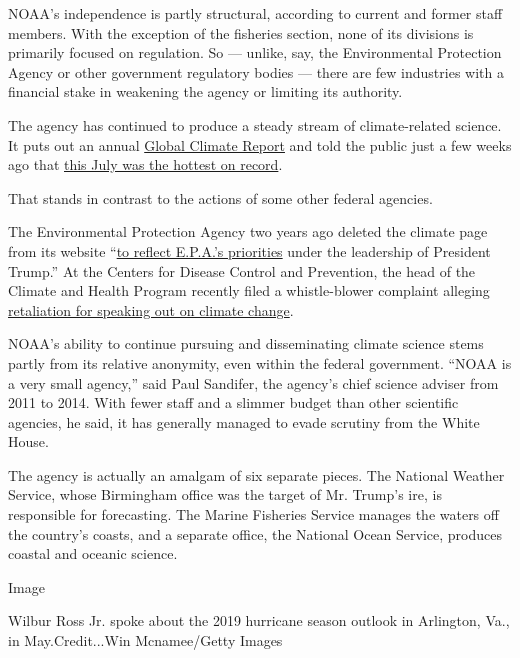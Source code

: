 NOAA's independence is partly structural, according to current and
former staff members. With the exception of the fisheries section, none
of its divisions is primarily focused on regulation. So --- unlike, say,
the Environmental Protection Agency or other government regulatory
bodies --- there are few industries with a financial stake in weakening
the agency or limiting its authority.

The agency has continued to produce a steady stream of climate-related
science. It puts out an annual
\href{https://www.ncdc.noaa.gov/sotc/global/201904}{Global Climate
Report} and told the public just a few weeks ago that
\href{https://www.noaa.gov/news/july-2019-was-hottest-month-on-record-for-planet}{this
July was the hottest on record}.

That stands in contrast to the actions of some other federal agencies.

The Environmental Protection Agency two years ago deleted the climate
page from its website
``\href{https://www.washingtonpost.com/news/energy-environment/wp/2017/05/04/the-epa-is-reviewing-its-climate-change-website-these-scientists-say-it-was-already-accurate/}{to
reflect E.P.A.'s priorities} under the leadership of President Trump.''
At the Centers for Disease Control and Prevention, the head of the
Climate and Health Program recently filed a whistle-blower complaint
alleging
\href{https://insideclimatenews.org/news/16082019/cdc-scientist-whistleblower-complaint-climate-health-research-trump-usda-epa}{retaliation
for speaking out on climate change}.

NOAA's ability to continue pursuing and disseminating climate science
stems partly from its relative anonymity, even within the federal
government. ``NOAA is a very small agency,'' said Paul Sandifer, the
agency's chief science adviser from 2011 to 2014. With fewer staff and a
slimmer budget than other scientific agencies, he said, it has generally
managed to evade scrutiny from the White House.

The agency is actually an amalgam of six separate pieces. The National
Weather Service, whose Birmingham office was the target of Mr. Trump's
ire, is responsible for forecasting. The Marine Fisheries Service
manages the waters off the country's coasts, and a separate office, the
National Ocean Service, produces coastal and oceanic science.

Image

Wilbur Ross Jr. spoke about the 2019 hurricane season outlook in
Arlington, Va., in May.Credit...Win Mcnamee/Getty Images

